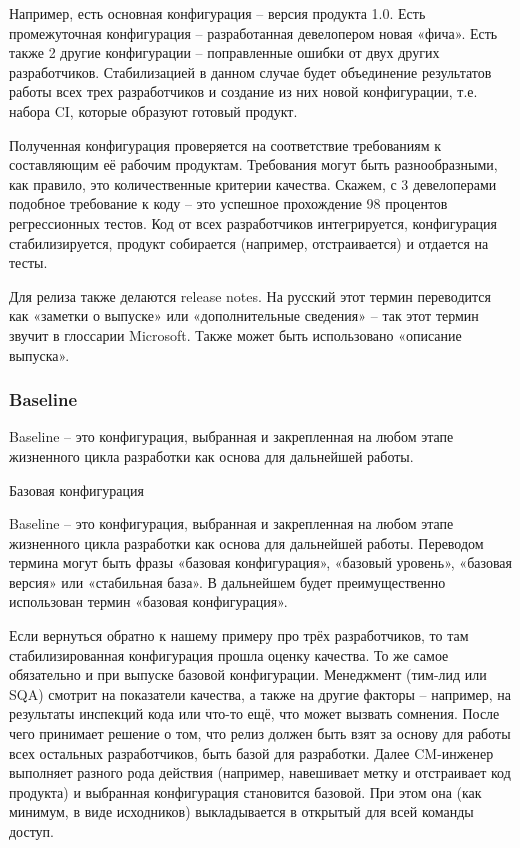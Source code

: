 \documentclass{../industrial-development}
\begin{document}
Например, есть основная конфигурация – версия продукта 1.0. Есть промежуточная конфигурация – разработанная девелопером новая «фича». Есть также 2 другие конфигурации – поправленные ошибки от двух других разработчиков. Стабилизацией в данном случае будет объединение результатов работы всех трех разработчиков и создание из них новой конфигурации, т.е. набора CI, которые образуют готовый продукт.

Полученная конфигурация проверяется на соответствие требованиям к составляющим её рабочим продуктам. Требования могут быть разнообразными, как правило, это количественные критерии качества. Скажем, с 3 девелоперами подобное требование к коду – это успешное прохождение 98 процентов регрессионных тестов. Код от всех разработчиков интегрируется, конфигурация стабилизируется, продукт собирается (например, отстраивается) и отдается на тесты.

Для релиза также делаются release notes. На русский этот термин переводится как «заметки о выпуске» или «дополнительные сведения» – так этот термин звучит в глоссарии Microsoft. Также может быть использовано «описание выпуска».
~\cite{Configurations}

\begin{frame} \frametitle{Baseline}
   \begin{block}{Baseline – это конфигурация, выбранная и закрепленная на любом этапе жизненного цикла разработки как основа для дальнейшей работы.}
  
 \end{block}
\end{frame}
	
	\lecturenotes
	Базовая конфигурация

Baseline – это конфигурация, выбранная и закрепленная на любом этапе жизненного цикла разработки как основа для дальнейшей работы. Переводом термина могут быть фразы «базовая конфигурация», «базовый уровень», «базовая версия» или «стабильная база». В дальнейшем будет преимущественно использован термин «базовая конфигурация».

Если вернуться обратно к нашему примеру про трёх разработчиков, то там стабилизированная конфигурация прошла оценку качества. То же самое обязательно и при выпуске базовой конфигурации. Менеджмент (тим-лид или SQA) смотрит на показатели качества, а также на другие факторы – например, на результаты инспекций кода или что-то ещё, что может вызвать сомнения. После чего принимает решение о том, что релиз должен быть взят за основу для работы всех остальных разработчиков, быть базой для разработки. Далее CM-инженер выполняет разного рода действия (например, навешивает метку и отстраивает код продукта) и выбранная конфигурация становится базовой. При этом она (как минимум, в виде исходников) выкладывается в открытый для всей команды доступ.
\end{document}
